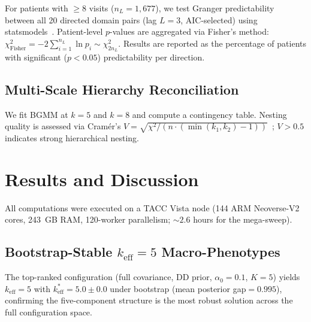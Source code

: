 \documentclass[runningheads]{llncs}
\begin{document}
For patients with ${\geq}8$ visits ($n_L{=}1{,}677$), we test Granger predictability~\cite{granger1969investigating} between all 20 directed domain pairs (lag $L{=}3$, AIC-selected) using statsmodels~\cite{seabold2010statsmodels}. Patient-level $p$-values are aggregated via Fisher's method: $\chi^2_{\text{Fisher}} = -2 \sum_{i=1}^{n_L} \ln p_i \sim \chi^2_{2n_L}$. Results are reported as the percentage of patients with significant ($p < 0.05$) predictability per direction.

\subsection{Multi-Scale Hierarchy Reconciliation}

We fit BGMM at $k{=}5$ and $k{=}8$ and compute a contingency table. Nesting quality is assessed via Cram\'{e}r's $V = \sqrt{\chi^2 / (n \cdot (\min(k_1, k_2) - 1))}$~\cite{cramer1946mathematical}; $V > 0.5$ indicates strong hierarchical nesting.

\section{Results and Discussion}

All computations were executed on a TACC Vista node (144 ARM Neoverse-V2 cores, 243~GB RAM, 120-worker parallelism; ${\sim}2.6$ hours for the mega-sweep).

\subsection{Bootstrap-Stable $k_{\mathrm{eff}}{=}5$ Macro-Phenotypes}

The top-ranked configuration (full covariance, DD prior, $\alpha_0{=}0.1$, $K{=}5$) yields $k_{\mathrm{eff}}{=}5$ with $k_{\mathrm{eff}}^*{=}5.0{\pm}0.0$ under bootstrap (mean posterior gap${=}0.995$), confirming the five-component structure is the most robust solution across the full configuration space.
\end{document}

